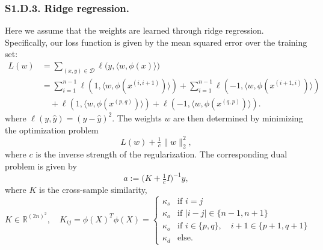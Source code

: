 \documentclass{article}
\theoremstyle{plain}
\begin{document}
\subsubsection*{S1.D.3. Ridge regression.}
Here we assume that the weights are learned through ridge regression. Specifically, our loss function is given by the mean squared error over the training set:
\begin{align}
L(w)
&= \sum_{(x,y)\in \mathcal{D}} \ell\!\bigl(y, \langle w, \phi(x)\rangle\bigr) \nonumber \\
&= \sum_{i=1}^{n-1} \ell\!\left(1, \bigl\langle w, \phi(x^{(i,i+1)})\bigr\rangle\right)
 + \sum_{i=1}^{n-1} \ell\!\left(-1, \bigl\langle w, \phi(x^{(i+1,i)})\bigr\rangle\right) \nonumber \\
&\quad + \ell\!\left(1, \bigl\langle w, \phi(x^{(p,q)})\bigr\rangle\right)
      + \ell\!\left(-1, \bigl\langle w, \phi(x^{(q,p)})\bigr\rangle\right).
\tag{S47}
\end{align}
where $\ell(y,\hat y) = (y - \hat y)^2$. The weights $w$ are then determined by minimizing the optimization problem
\begin{equation}
L(w) + \tfrac{1}{c}\|w\|_2^2,
\tag{S48}
\end{equation}
where $c$ is the inverse strength of the regularization. The corresponding dual problem is given by
\begin{equation}
a := \bigl(K + \tfrac{1}{c} I \bigr)^{-1} y,
\tag{S49}
\end{equation}
where $K$ is the cross-sample similarity,
\begin{equation}
K \in \mathbb{R}^{(2n)^2}, 
\quad K_{ij} = \phi(X)^T \phi(X) = 
\begin{cases}
\kappa_s & \text{if } i = j\\
\kappa_o & \text{if } |i-j|\in\{n-1, n+1\} \\
\kappa_o & \text{if } i \in \{p,q\}, \quad i+1 \in \{p+1,q+1\}\\
\kappa_d & \text{else}.
\end{cases}
\tag{S50}
\end{equation}
\end{document}
